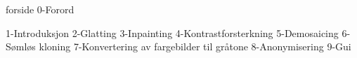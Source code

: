\documentclass{article}
\begin{document}
{forside}
\frontmatter
{0-Forord}
\newpage
\tableofcontents

\newpage
\mainmatter
{1-Introduksjon}
{2-Glatting}
{3-Inpainting}
{4-Kontrastforsterkning}
{5-Demosaicing}
{6-Sømløs kloning}
{7-Konvertering av fargebilder til gråtone}
{8-Anonymisering}
{9-Gui}

\newpage
\listoffigures
\newpage

\nocite{PCP}
\end{document}
